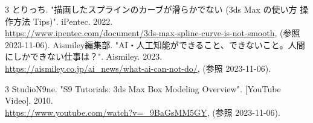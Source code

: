 \documentclass[a4j]{jarticle}
\begin{document}
\newpage
\renewcommand{\refname}{引用文献}
\begin{thebibliography}{3}
    とりっち. "描画したスプラインのカーブが滑らかでない (3ds Max の使い方 操作方法 Tips)". iPentec. 2022. \\
    \url{https://www.ipentec.com/document/3ds-max-spline-curve-is-not-smooth}, (参照 2023-11-06).
    Aismiley編集部. "AI・人工知能ができること、できないこと。人間にしかできない仕事は？". Aismiley. 2023. \\
    \url{https://aismiley.co.jp/ai_news/what-ai-can-not-do/}, (参照 2023-11-06).
\end{thebibliography}

\renewcommand{\refname}{参考文献}
\begin{thebibliography}{3}
    StudioN9ne. "S9 Tutorials: 3ds Max Box Modeling Overview". [YouTube Video]. 2010. \\
    \url{https://www.youtube.com/watch?v=_9BaGsMM5GY}, (参照 2023-11-06).
\end{thebibliography}
\end{document}
